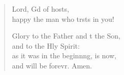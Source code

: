 \begin{verse}
\begin{patverse}
Lord, Gd of hosts,\Med\\
happy the man who trsts in you!

Glory to the Father and t the Son,\Med\\
and to the Hly Spirit:\\
as it was in the beginn\pointup{\i}ng, is now,\Med\\
and will be forevr. Amen. 
  \end{patverse}
\end{verse}
